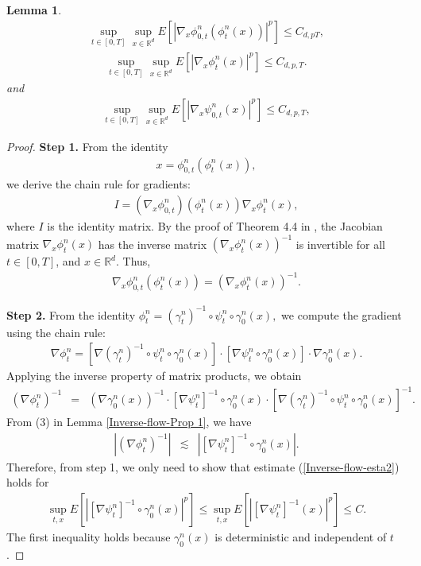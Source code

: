 \documentclass[12pt,oneside, reqno]{amsart}
\newcommand{\be}{\begin{eqnarray}}
\newcommand{\ee}{\end{eqnarray}}
\newcommand{\ce}{\begin{eqnarray*}}
\newcommand{\de}{\end{eqnarray*}}
\newtheorem{lemma}[theorem]{Lemma}
\def\mR{{\mathbb R}}
\def\leq{\leqslant}
\numberwithin{equation}{section}
\begin{document}
\begin{lemma}
	\be \label{Inverse-flow-esta2}
\sup_{t\in [0,T]}\sup_{x\in \mR^d} E\left[|\nabla_x \phi_{0,t}^{n}(\phi_t^n(x))|^p\right] \leq C_{d,pT},
	\ee
		\be \label{Inverse-flow-esta3}
	\sup_{t\in [0,T]}\sup_{x\in \mR^d}  E[|\nabla_x \phi_t^{n}(x)|^p]\leq C_{d,p,T}.
	\ee 
	and 
		\be \label{Inverse-flow-esta4}
	\sup_{t\in [0,T]}\sup_{x\in \mR^d}  E[|\nabla_x \psi_{0,t}^{n}(x)|^p]\leq C_{d,p,T},
	\ee 
\end{lemma}

\begin{proof}
	\textbf{Step 1.} From the identity
	\ce 
	x=\phi_{0,t}^n(\phi_t^n(x)),
	\de 
we derive the chain rule for gradients:
	\ce 
	I=(\nabla_x \phi_{0,t}^n)(\phi_t^n(x)) \nabla_x \phi_t^n(x),
	\de
	where $I$ is the identity matrix. By the proof of Theorem 4.4 in \cite{Kunita1984}, the Jacobian matrix $\nabla_x \phi_t^n(x)$ has the inverse matrix $(\nabla_x \phi_t^n(x))^{-1}$  is invertible for all  $t\in [0,T]$, and $x\in \mR^d$. Thus,
	\ce 
	\nabla_x \phi_{0,t}^n(\phi_t^n(x)) =(\nabla_x \phi_t^n(x))^{-1}.
	\de
	
	\textbf{Step 2.} From the  identity $
	\phi_t^n = (\gamma_t^n)^{-1} \circ \psi_t^n \circ \gamma_0^n(x),$ we compute the gradient using the chain rule:
	\ce 
	\nabla \phi_t^n = [\nabla (\gamma_t^n)^{-1} \circ \psi_t^n \circ \gamma_0^n(x)]\cdot [\nabla \psi_t^n \circ \gamma_0^n(x)]\cdot \nabla \gamma_0^n(x).
	\de 
Applying the inverse property of matrix products, we obtain
	\ce 
	(\nabla \phi_t^n)^{-1} &=&( \nabla \gamma_0^n(x))^{-1}\cdot [\nabla \psi_t^n ]^{-1}\circ \gamma_0^n(x)\cdot [\nabla (\gamma_t^n)^{-1} \circ \psi_t^n \circ \gamma_0^n(x)]^{-1}.
	\de 
	From (3) in Lemma \ref{Inverse-flow-Prop 1}, we have 
		\ce 
	|(\nabla \phi_t^n)^{-1} |&\lesssim & |[\nabla \psi_t^n ]^{-1}\circ \gamma_0^n(x)|.
	\de 
	Therefore, from step 1, we only need to show that estimate (\ref{Inverse-flow-esta2}) holds for 
	\ce 
	\sup_{t,x}  E[|[\nabla \psi_t^n ]^{-1}\circ \gamma_0^n(x)|^p] \leq \sup_{t,x}  E[|[\nabla \psi_t^n ]^{-1}(x)|^p]\leq C.
	\de 
	The first inequality holds because $\gamma_0^n(x)$ is deterministic and independent of $t$.
	

\end{proof}
\end{document}
